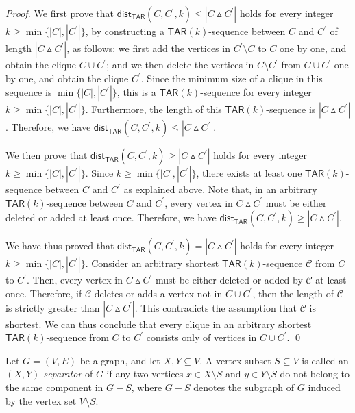 \documentclass{llncs}
\newcommand{\TAR}[1]{\mathsf{TAR}(#1)}
\newcommand{\symdiff}[2]{#1 \vartriangle #2}
\newcommand{\cliq}{C}
\newcommand{\distTAR}[3]{\mathsf{dist_{TAR}}(#1,#2,#3)}
\newcounter{one}
\newcounter{two}
\begin{document}
	\begin{proof}
	We first prove that $\distTAR{\cliq}{\cliq^\prime}{k} \le |\symdiff{\cliq}{\cliq^\prime}|$ holds for every integer $k \ge \min\{|\cliq|, |\cliq^\prime|\}$, by constructing a $\TAR{k}$-sequence between $\cliq$ and $\cliq^\prime$ of length $|\symdiff{\cliq}{\cliq^\prime}|$, as follows:
we first add the vertices in $\cliq^\prime \setminus \cliq$ to $\cliq$ one by one, and obtain the clique $\cliq \cup \cliq^\prime$; and 
we then delete the vertices in $\cliq \setminus \cliq^\prime$ from $\cliq \cup \cliq^\prime$ one by one, and obtain the clique $\cliq^\prime$.
	Since the minimum size of a clique in this sequence is $\min \{ |\cliq|, |\cliq^\prime| \}$, this is a $\TAR{k}$-sequence for every integer $k \ge \min\{|\cliq|, |\cliq^\prime|\}$. 
	Furthermore, the length of this $\TAR{k}$-sequence is $|\symdiff{\cliq}{\cliq^\prime}|$.
	Therefore, we have $\distTAR{\cliq}{\cliq^\prime}{k} \le |\symdiff{\cliq}{\cliq^\prime}|$.
	
	We then prove that $\distTAR{\cliq}{\cliq^\prime}{k} \ge |\symdiff{\cliq}{\cliq^\prime}|$ holds for every integer $k \ge \min\{|\cliq|, |\cliq^\prime|\}$.
	Since $k \ge \min\{|\cliq|, |\cliq^\prime|\}$, there exists at least one $\TAR{k}$-sequence between $\cliq$ and $\cliq^\prime$ as explained above. 
	Note that, in an arbitrary $\TAR{k}$-sequence between $\cliq$ and $\cliq^\prime$, every vertex in $\symdiff{\cliq}{\cliq^\prime}$ must be either deleted or added at least once. 
	Therefore, we have $\distTAR{\cliq}{\cliq^\prime}{k} \ge |\symdiff{\cliq}{\cliq^\prime}|$.
	
	We have thus proved that $\distTAR{\cliq}{\cliq^\prime}{k} = |\symdiff{\cliq}{\cliq^\prime}|$ holds for every integer $k \ge \min\{|\cliq|, |\cliq^\prime|\}$.
	Consider an arbitrary shortest $\TAR{k}$-sequence $\mathcal{C}$ from $\cliq$ to $\cliq^\prime$. 
	Then, every vertex in $\symdiff{\cliq}{\cliq^\prime}$ must be either deleted or added by $\mathcal{C}$ at least once.
	Therefore, if $\mathcal{C}$ deletes or adds a vertex not in $\cliq \cup \cliq^\prime$, then the length of $\mathcal{C}$ is strictly greater than $|\symdiff{\cliq}{\cliq^\prime}|$.
	This contradicts the assumption that $\mathcal{C}$ is shortest.
	We can thus conclude that every clique in an arbitrary shortest $\TAR{k}$-sequence from $\cliq$ to $\cliq^\prime$ consists only of vertices in $\cliq \cup \cliq^\prime$.
	\qed
	\end{proof}

	Let $G = (V,E)$ be a graph, and let $X, Y \subseteq V$.
	A vertex subset $S \subseteq V$ is called an \emph{$(X, Y)$-separator} of $G$ if any two vertices $x \in X \setminus S$ and $y \in Y \setminus S$ do not belong to the same component in $G-S$, where $G-S$ denotes the subgraph of $G$ induced by the vertex set $V \setminus S$.
\medskip
\end{document}
